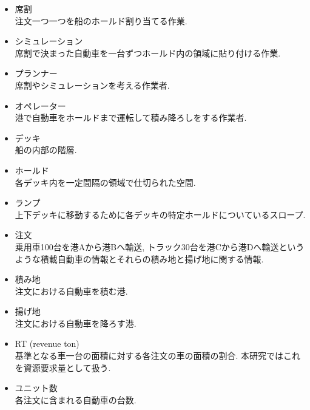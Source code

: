 \begin{itemize}

\item 席割 \\
注文一つ一つを船のホールド割り当てる作業.

\item シミュレーション \\
席割で決まった自動車を一台ずつホールド内の領域に貼り付ける作業.

\item  プランナー \\
席割やシミュレーションを考える作業者.

\item  オペレーター\\
港で自動車をホールドまで運転して積み降ろしをする作業者.

\item デッキ \\
船の内部の階層.

\item ホールド \\
各デッキ内を一定間隔の領域で仕切られた空間.

\item ランプ \\
上下デッキに移動するために各デッキの特定ホールドについているスロープ.

\item 注文 \\
乗用車100台を港Aから港Bへ輸送, トラック30台を港Cから港Dへ輸送というような積載自動車の情報とそれらの積み地と揚げ地に関する情報.

\item 積み地 \\
注文における自動車を積む港.

\item 揚げ地 \\
注文における自動車を降ろす港.

\item  RT (revenue ton) \\
基準となる車一台の面積に対する各注文の車の面積の割合. 本研究ではこれを資源要求量として扱う\cite{rt}.

\item ユニット数 \\
各注文に含まれる自動車の台数.

\end{itemize}


